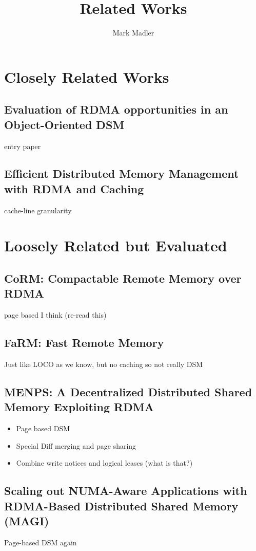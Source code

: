 \documentclass[sigplan,nonacm]{acmart}
\title{Related Works}
\author{Mark Madler}
\begin{document}
\maketitle
\section{Closely Related Works}
\subsection{Evaluation of RDMA opportunities in an Object-Oriented DSM}
entry paper\cite{Veldema-LCPC-2007}


\subsection{Efficient Distributed Memory Management with RDMA and Caching }
cache-line granularity\cite{Cai-VLDB-2018}

\section{Loosely Related but Evaluated}
\subsection{CoRM: Compactable Remote Memory over RDMA}
page based I think (re-read this)\cite{Taranov-ICMD-2021}


\subsection{FaRM: Fast Remote Memory}
Just like LOCO as we know, but no caching so not really DSM\cite{Dragojevic-NSDI-2014}


\subsection{MENPS: A Decentralized Distributed Shared Memory Exploiting RDMA}
\begin{itemize}
    \item Page based DSM
    \item Special Diff merging and page sharing
    \item Combine write notices and logical leases (what is that?)\cite{Endo-IPDRM-2020}
\end{itemize}

\subsection{Scaling out NUMA-Aware Applications with RDMA-Based Distributed Shared Memory (MAGI)}
Page-based DSM again\cite{Hong-JCST-2019}
\end{document}
